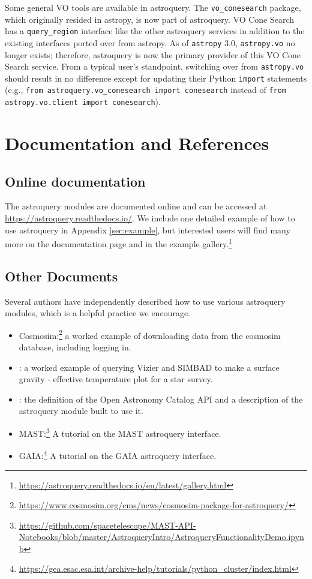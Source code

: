 \documentclass[twocolumn]{aastex62}
\newcommand{\package}[1]{\texttt{#1}\xspace}
\newcommand{\astropypkg}{\package{astropy}}
\begin{document}
Some general VO tools are available in astroquery.  The \texttt{vo\_conesearch}
package, which originally resided in astropy, is now part of astroquery.  VO
Cone Search has a \texttt{query\_region} interface like the other astroquery
services in addition to the existing interfaces ported over from astropy.
As of \astropypkg 3.0, \texttt{astropy.vo} no longer exists; therefore,
astroquery is now the primary provider of this VO Cone Search service. From a
typical user's standpoint, switching over from \texttt{astropy.vo} should
result in no difference except for updating their Python \texttt{import}
statements (e.g., \texttt{from astroquery.vo\_conesearch import conesearch}
instead of \texttt{from astropy.vo.client import conesearch}).



\section{Documentation and References}
\label{sec:documentation}
\subsection{Online documentation}
The astroquery modules are documented online and can be accessed  at
\url{https://astroquery.readthedocs.io/}.  We include one detailed example of
how to use astroquery in Appendix \ref{sec:example},
but interested users will find many more on the documentation page and
in the example gallery.\footnote{\url{https://astroquery.readthedocs.io/en/latest/gallery.html}}

\subsection{Other Documents}
Several authors have independently described how to use various astroquery
modules, which is a helpful practice we encourage.
 \begin{itemize}
    \item
        Cosmosim:\footnote{\url{https://www.cosmosim.org/cms/news/cosmosim-package-for-astroquery/}}
        a worked example of downloading data from the cosmosim database,
        including logging in.
    \item \citet{Paletou2014a}: a worked example of querying
        Vizier and SIMBAD to make a surface gravity - effective temperature
        plot for a star survey.
    \item \citet{Guillochon2018a}: the definition of
        the Open Astronomy Catalog API and a description of the astroquery
        module built to use it.
    \item
        MAST:\footnote{\url{https://github.com/spacetelescope/MAST-API-Notebooks/blob/master/AstroqueryIntro/AstroqueryFunctionalityDemo.ipynb}}
        A tutorial on the MAST astroquery interface.
    \item GAIA:\footnote{\url{https://gea.esac.esa.int/archive-help/tutorials/python_cluster/index.html}}
        A tutorial on the GAIA astroquery interface.
\end{itemize}
\end{document}
